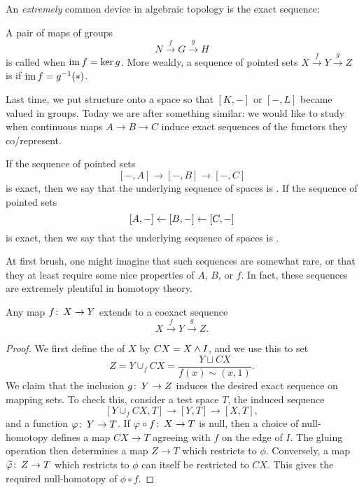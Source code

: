 An \emph{extremely} common device in algebraic topology is the exact sequence:

\begin{definition}
A pair of maps of groups \[N \xrightarrow f G \xrightarrow g H\] is called  when $\operatorname{im} f = \ker g$.
More weakly, a sequence of pointed sets $X \xrightarrow f Y \xrightarrow g Z$ is  if $\operatorname{im} f = g^{-1}(*)$.
\end{definition}

\noindent
Last time, we put structure onto a space so that $[K, -]$ or $[-, L]$ became valued in groups.
Today we are after something similar: we would like to study when continuous maps $A \to B \to C$ induce exact sequences of the functors they co/represent.

\begin{definition}
If the sequence of pointed sets \[[-, A] \to [-, B] \to [-, C]\] is exact, then we say that the underlying sequence of spaces is .
If the sequence of pointed sets \[[A, -] \leftarrow [B, -] \leftarrow [C, -]\] is exact, then we say that the underlying sequence of spaces is .%
\end{definition}

At first brush, one might imagine that such sequences are somewhat rare, or that they at least require some nice properties of $A$, $B$, or $f$.%
In fact, these sequences are extremely plentiful in homotopy theory.

\begin{lemma}\label{CoexactSeqsExist}%
Any map $f\colon\thinspace X \to Y$ extends to a coexact sequence \[X \xrightarrow f Y \xrightarrow g Z.\]
\end{lemma}
\begin{proof}
We first define the  of $X$ by $CX = X \wedge I$, and we use this to set \[Z = Y \cup_f CX = \frac{Y \sqcup CX}{f(x) \sim (x, 1)}.\]
We claim that the inclusion $g\colon\thinspace Y \to Z$ induces the desired exact sequence on mapping sets.
To check this, consider a test space $T$, the induced sequence \[[Y \cup_f CX, T] \to [Y, T] \to [X, T],\] and a function $\varphi\colon\thinspace Y \to T$.
If $\varphi \circ f\colon\thinspace X \to T$ is null, then a choice of null-homotopy defines a map $CX \to T$ agreeing with $f$ on the edge of $I$.
The gluing operation then determines a map $Z \to T$ which restricts to $\phi$.
Conversely, a map $\widetilde {\varphi}\colon\thinspace Z \to T$ which restricts to $\phi$ can itself be restricted to $CX$.
This gives the required null-homotopy of $\phi \circ f$.
\end{proof}

